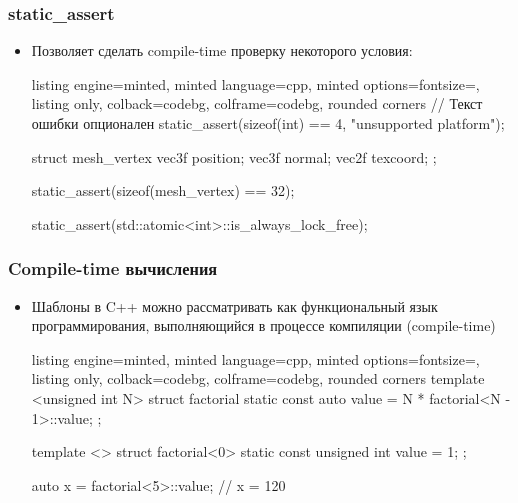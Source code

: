 \documentclass[10pt]{beamer}
\begin{document}
\begin{frame}[fragile]
\frametitle{static\_assert}
\begin{itemize}
\item Позволяет сделать compile-time проверку некоторого условия:
\begin{tcblisting}{listing engine=minted, minted language=cpp, minted options={fontsize=\scriptsize}, listing only, colback=codebg, colframe=codebg, rounded corners}
// Текст ошибки опционален
static_assert(sizeof(int) == 4, "unsupported platform");

struct mesh_vertex {
  vec3f position;
  vec3f normal;
  vec2f texcoord;
};

static_assert(sizeof(mesh_vertex) == 32);

static_assert(std::atomic<int>::is_always_lock_free);
\end{tcblisting}
\end{itemize}
\end{frame}

\begin{frame}[fragile]
\frametitle{Compile-time вычисления}
\begin{itemize}
\item Шаблоны в C++ можно рассматривать как функциональный язык программирования, выполняющийся в процессе компиляции (compile-time)
\pause
{}
\begin{tcblisting}{listing engine=minted, minted language=cpp, minted options={fontsize=\scriptsize}, listing only, colback=codebg, colframe=codebg, rounded corners}
template <unsigned int N>
struct factorial {
  static const auto value = N * factorial<N - 1>::value;
};

template <>
struct factorial<0> {
  static const unsigned int value = 1;
};

auto x = factorial<5>::value; // x = 120
\end{tcblisting}
\end{itemize}
\end{frame}
\end{document}
